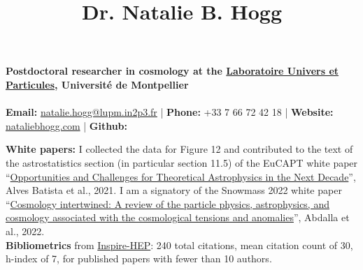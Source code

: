 \documentclass[11pt]{article}
\begin{document}
	
	\title{Dr. Natalie B. Hogg} %
	
	\textbf{Postdoctoral researcher in cosmology at the \href{https://www.lupm.in2p3.fr/}{Laboratoire Univers et Particules}, Universit\'e de Montpellier}\\ \\
	\textbf{Email:} \href{mailto:natalie.hogg@lupm.in2p3.fr}{natalie.hogg@lupm.in2p3.fr} | \textbf{Phone:} +33 7 66 72 42 18 | \textbf{Website:} \href{nataliebhogg.com}{nataliebhogg.com} | \textbf{Github:} \href{https://github.com/nataliehogg}{\faGithub}
	
	\renewcommand\refname{\LARGE Publications}
	
	\nocite{*}
	
	
	\textbf{White papers:} I collected the data for Figure 12 and contributed to the text of the astrostatistics section (in particular section 11.5) of the EuCAPT white paper ``\href{https://arxiv.org/abs/2110.10074}{Opportunities and Challenges for Theoretical Astrophysics in the Next Decade}'', Alves Batista et al., 2021. I am a signatory of the Snowmass 2022 white paper ``\href{https://doi.org/10.1016/j.jheap.2022.04.002}{Cosmology intertwined: A review of the particle physics, astrophysics, and cosmology associated with the cosmological tensions and anomalies}'', Abdalla et al., 2022.\\
	
	\textbf{Bibliometrics} from \href{https://inspirehep.net/literature?sort=mostrecent&size=25&page=1&q=a%20n%20hogg&author_count=10%20authors%20or%20less&ui-citation-summary=true}{Inspire-HEP}: 240 total citations, mean citation count of 30, h-index of 7, for published papers with fewer than 10 authors.
	
\end{document}
